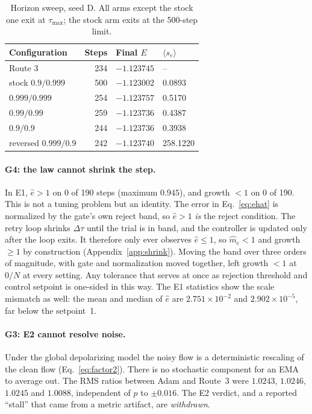 \documentclass[aps,pra,reprint,superscriptaddress,nofootinbib]{revtex4-2}
\newcommand{\dt}{\Delta\tau}
\begin{document}
\begin{table}[t]
\caption{Horizon sweep, seed D. All arms except the stock one exit at $\tau_{\max}$; the stock arm exits at the 500-step limit.}
\label{tab:horizon}
\begin{ruledtabular}
\begin{tabular}{lrll}
Configuration & Steps & Final $E$ & $\langle s_e\rangle$ \\
\midrule
Route 3 & 234 & $-1.123745$ & -- \\
stock $0.9/0.999$ & 500 & $-1.123002$ & 0.0893 \\
$0.999/0.999$ & 254 & $-1.123757$ & 0.5170 \\
$0.99/0.99$ & 259 & $-1.123736$ & 0.4387 \\
$0.9/0.9$ & 244 & $-1.123736$ & 0.3938 \\
reversed $0.999/0.9$ & 242 & $-1.123740$ & 258.1220 \\
\end{tabular}
\end{ruledtabular}
\end{table}

\paragraph*{G4: the law cannot shrink the step.} In E1, $\hat e>1$ on 0 of 190 steps (maximum
$0.945$), and growth $<1$ on 0 of 190. This is not a tuning problem but an identity. The error
in Eq.~\eqref{eq:ehat} is normalized by the gate's own reject band, so $\hat e>1$ \emph{is} the
reject condition. The retry loop shrinks $\dt$ until the trial is in band, and the controller
is updated only after the loop exits. It therefore only ever observes $\hat e\le1$, so
$\hat m_e<1$ and growth $\ge1$ by construction (Appendix~\ref{app:shrink}). Moving the band over
three orders of magnitude, with gate and normalization moved together, left growth $<1$ at
$0/N$ at every setting. Any tolerance that serves at once as rejection threshold and control
setpoint is one-sided in this way. The E1 statistics show the scale mismatch as well: the
mean and median of $\hat e$ are $2.751\times10^{-2}$ and $2.902\times10^{-5}$, far below the
setpoint~1.

\paragraph*{G3: E2 cannot resolve noise.} Under the global depolarizing model the noisy flow is
a deterministic rescaling of the clean flow (Eq.~\eqref{eq:factor2}). There is no stochastic
component for an EMA to average out. The RMS ratios between Adam and Route~3 were
$1.0243$, $1.0246$, $1.0245$ and $1.0088$, independent of $p$ to $\pm0.016$. The E2 verdict,
and a reported ``stall'' that came from a metric artifact, are \emph{withdrawn}.
\end{document}
